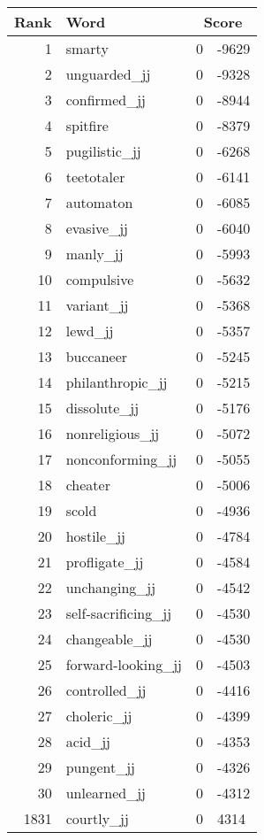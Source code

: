 \begin{longtable}[!htbp]{| rlr@{.}l |}
    \hline
    \textbf{Rank} & \textbf{Word} & \multicolumn{2}{c|}{\textbf{Score}} \\
    \hline
    \endhead
    1 & smarty & 0 & -9629 \\
    2 & unguarded\_jj & 0 & -9328 \\
    3 & confirmed\_jj & 0 & -8944 \\
    4 & spitfire & 0 & -8379 \\
    5 & pugilistic\_jj & 0 & -6268 \\
    6 & teetotaler & 0 & -6141 \\
    7 & automaton & 0 & -6085 \\
    8 & evasive\_jj & 0 & -6040 \\
    9 & manly\_jj & 0 & -5993 \\
    10 & compulsive & 0 & -5632 \\
    11 & variant\_jj & 0 & -5368 \\
    12 & lewd\_jj & 0 & -5357 \\
    13 & buccaneer & 0 & -5245 \\
    14 & philanthropic\_jj & 0 & -5215 \\
    15 & dissolute\_jj & 0 & -5176 \\
    16 & nonreligious\_jj & 0 & -5072 \\
    17 & nonconforming\_jj & 0 & -5055 \\
    18 & cheater & 0 & -5006 \\
    19 & scold & 0 & -4936 \\
    20 & hostile\_jj & 0 & -4784 \\
    21 & profligate\_jj & 0 & -4584 \\
    22 & unchanging\_jj & 0 & -4542 \\
    23 & self-sacrificing\_jj & 0 & -4530 \\
    24 & changeable\_jj & 0 & -4530 \\
    25 & forward-looking\_jj & 0 & -4503 \\
    26 & controlled\_jj & 0 & -4416 \\
    27 & choleric\_jj & 0 & -4399 \\
    28 & acid\_jj & 0 & -4353 \\
    29 & pungent\_jj & 0 & -4326 \\
    30 & unlearned\_jj & 0 & -4312 \\
    1831 & courtly\_jj & 0 & 4314 \\

\end{longtable}
